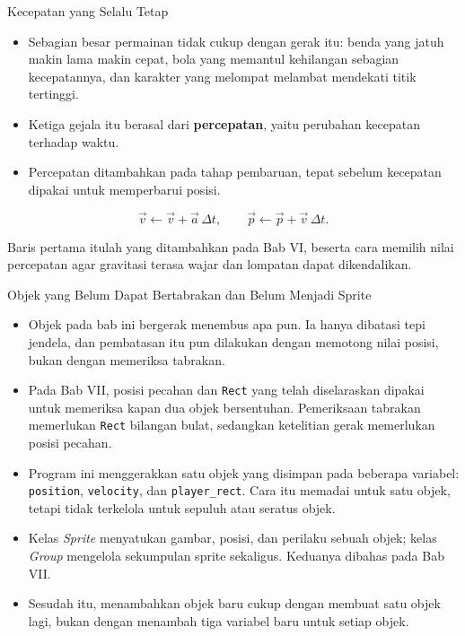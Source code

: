 \documentclass[aspectratio=169,10pt]{beamer}
\begin{document}
\begin{frame}{Kecepatan yang Selalu Tetap}
\begin{itemize}
  \item Sebagian besar permainan tidak cukup dengan gerak itu: benda yang jatuh
        makin lama makin cepat, bola yang memantul kehilangan sebagian
        kecepatannya, dan karakter yang melompat melambat mendekati titik
        tertinggi.
  \item Ketiga gejala itu berasal dari \textbf{percepatan}, yaitu perubahan
        kecepatan terhadap waktu.
  \item Percepatan ditambahkan pada tahap pembaruan, tepat sebelum kecepatan
        dipakai untuk memperbarui posisi.
\end{itemize}
\[
\vec{v} \leftarrow \vec{v} + \vec{a}\,\Delta t,
\qquad
\vec{p} \leftarrow \vec{p} + \vec{v}\,\Delta t .
\]
\begin{kotak}
Baris pertama itulah yang ditambahkan pada Bab VI, beserta cara memilih nilai
percepatan agar gravitasi terasa wajar dan lompatan dapat dikendalikan.
\end{kotak}
\end{frame}

\begin{frame}{Objek yang Belum Dapat Bertabrakan dan Belum Menjadi Sprite}
\begin{itemize}
  \item Objek pada bab ini bergerak menembus apa pun. Ia hanya dibatasi tepi
        jendela, dan pembatasan itu pun dilakukan dengan memotong nilai posisi,
        bukan dengan memeriksa tabrakan.
  \item Pada Bab VII, posisi pecahan dan \texttt{Rect} yang telah diselaraskan
        dipakai untuk memeriksa kapan dua objek bersentuhan. Pemeriksaan
        tabrakan memerlukan \texttt{Rect} bilangan bulat, sedangkan ketelitian
        gerak memerlukan posisi pecahan.
  \item Program ini menggerakkan satu objek yang disimpan pada beberapa
        variabel: \texttt{position}, \texttt{velocity}, dan \texttt{player\_rect}.
        Cara itu memadai untuk satu objek, tetapi tidak terkelola untuk sepuluh
        atau seratus objek.
  \item Kelas \emph{Sprite} menyatukan gambar, posisi, dan perilaku sebuah objek;
        kelas \emph{Group} mengelola sekumpulan sprite sekaligus. Keduanya
        dibahas pada Bab VII.
  \item Sesudah itu, menambahkan objek baru cukup dengan membuat satu objek
        lagi, bukan dengan menambah tiga variabel baru untuk setiap objek.
\end{itemize}
\end{frame}
\end{document}

